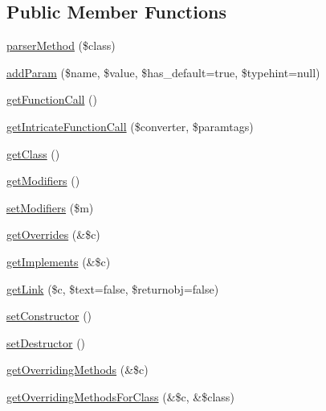 \subsection*{\-Public \-Member \-Functions}
\begin{DoxyCompactItemize}
\item 
\hyperlink{classparser_method_ae38553b728a0b4e9aa12234eead22094}{parser\-Method} (\$class)
\item 
\hyperlink{classparser_method_a5973657b3fd5aedaf316f04ed150611a}{add\-Param} (\$name, \$value, \$has\-\_\-default=true, \$typehint=null)
\item 
\hyperlink{classparser_method_a5ef78d1a821ab72d3d3cfb761df1b0fe}{get\-Function\-Call} ()
\item 
\hyperlink{classparser_method_a8990974e1e3504ebf1ec7568ba204d75}{get\-Intricate\-Function\-Call} (\$converter, \$paramtags)
\item 
\hyperlink{classparser_method_a23ecbde357f7f6bde5a50f876334a74d}{get\-Class} ()
\item 
\hyperlink{classparser_method_a781d75979d7792ce3e5e4dcf79a623c9}{get\-Modifiers} ()
\item 
\hyperlink{classparser_method_aaf5a37db0e5ff1e3deb9a3c575b325f6}{set\-Modifiers} (\$m)
\item 
\hyperlink{classparser_method_aae48ba0a23cdf3199b2a7d4eecd0eed3}{get\-Overrides} (\&\$c)
\item 
\hyperlink{classparser_method_a27c2b573604fe6459c0dc58d70150fba}{get\-Implements} (\&\$c)
\item 
\hyperlink{classparser_method_a06461a82056b3b599f7011fdf0840877}{get\-Link} (\$c, \$text=false, \$returnobj=false)
\item 
\hyperlink{classparser_method_a69267816717b9cbacf8219889eb2c451}{set\-Constructor} ()
\item 
\hyperlink{classparser_method_ace3f8d33d849ad6585131267124565a8}{set\-Destructor} ()
\item 
\hyperlink{classparser_method_af963cded27ba96d4a58ae3c939a67ced}{get\-Overriding\-Methods} (\&\$c)
\item 
\hyperlink{classparser_method_a65abc851f0ffae483c0d1ee8a5bd66b2}{get\-Overriding\-Methods\-For\-Class} (\&\$c, \&\$class)
\end{DoxyCompactItemize}
